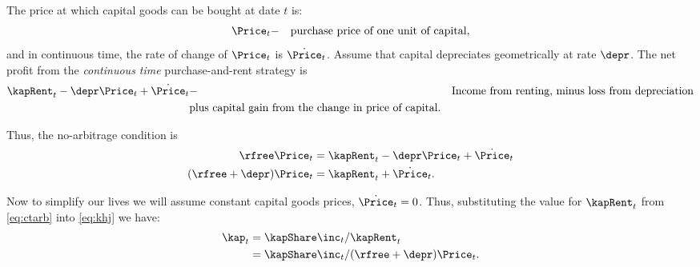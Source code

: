The price at which capital goods can be bought at date $t$ is: 
\begin{equation}\begin{gathered}\begin{aligned}
        \Price_{t} & - & \text{purchase price of one unit of capital},
\end{aligned}\end{gathered}\end{equation}
and in continuous time, the rate of change of $\Price_{t}$ is $\dot{\Price}_{t}$.  Assume
that capital depreciates geometrically at rate $\depr$.  The net profit
from the {\it continuous time} purchase-and-rent strategy is
\begin{equation}\begin{gathered}\begin{aligned}
        \kapRent_{t}-\depr \Price_{t}+\dot{\Price}_{t} & - & \text{Income from renting, minus loss from depreciation}  \\
         &   \text{plus capital gain from the change in price of capital}. \nonumber
\end{aligned}\end{gathered}\end{equation}

\thispagestyle{empty}

Thus, the no-arbitrage condition is 
\begin{equation}\begin{gathered}\begin{aligned}
        \rfree \Price_{t} & =  \kapRent_{t} - \depr \Price_{t} + \dot{\Price}_{t}
\\  (\rfree+\depr) \Price_{t} & =  \kapRent_{t}+\dot{\Price}_{t}     \label{eq:ctarb}.
\end{aligned}\end{gathered}\end{equation}

Now to simplify our lives we will assume constant capital goods
prices, $\dot{\Price}_{t}=0$.  Thus, substituting the value for $\kapRent_{t}$ from
\eqref{eq:ctarb} into \eqref{eq:khj} we have:
\begin{equation}\begin{gathered}\begin{aligned}
        \kap_{t} & =  \kapShare \inc_{t}/\kapRent_{t}  \\
         & =  \kapShare \inc_{t}/(\rfree+\depr)\Price_{t}.
\end{aligned}\end{gathered}\end{equation}


